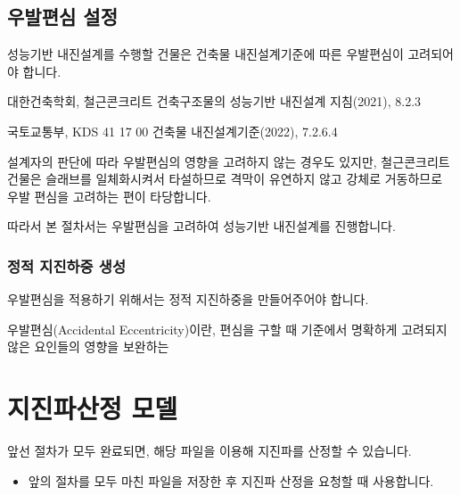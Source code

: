 \documentclass[a4paper,11pt,korean,openany,oneside]{sphinxmanual}
\begin{document}
\subsection{우발편심 설정}
\label{\detokenize{1_mass_ecc_setting:id5}}
\sphinxAtStartPar
성능기반 내진설계를 수행할 건물은 건축물 내진설계기준에 따른 우발편심이 고려되어야 합니다. %
\begin{footnote}[3]\sphinxAtStartFootnote
대한건축학회, 철근콘크리트 건축구조물의 성능기반 내진설계 지침(2021), 8.2.3

\sphinxAtStartPar
국토교통부, KDS 41 17 00 건축물 내진설계기준(2022), 7.2.6.4
%
\end{footnote}
설계자의 판단에 따라 우발편심의 영향을 고려하지 않는 경우도 있지만,
철근콘크리트 건물은 슬래브를 일체화시켜서 타설하므로 격막이 유연하지 않고 강체로 거동하므로 우발 편심을 고려하는 편이 타당합니다.

\sphinxAtStartPar
따라서 본 절차서는 우발편심을 고려하여 성능기반 내진설계를 진행합니다.


\subsubsection{정적 지진하중 생성}
\label{\detokenize{1_mass_ecc_setting:id7}}
\sphinxAtStartPar
우발편심을 적용하기 위해서는 정적 지진하중을 만들어주어야 합니다.

\sphinxAtStartPar
우발편심(Accidental Eccentricity)이란, 편심을 구할 때 기준에서 명확하게 고려되지 않은 요인들의 영향을 보완하는

\sphinxstepscope


\section{지진파산정 모델}
\label{\detokenize{1_seismic_wave_request_model:id1}}\label{\detokenize{1_seismic_wave_request_model::doc}}
\sphinxAtStartPar
앞선 절차가 모두 완료되면, 해당 파일을 이용해 지진파를 산정할 수 있습니다.

\begin{sphinxShadowBox}
\begin{itemize}
\item {} 
\sphinxAtStartPar
앞의 절차를 모두 마친 파일을 저장한 후 지진파 산정을 요청할 때 사용합니다.

\end{itemize}
\end{sphinxShadowBox}

\sphinxstepscope
\end{document}
